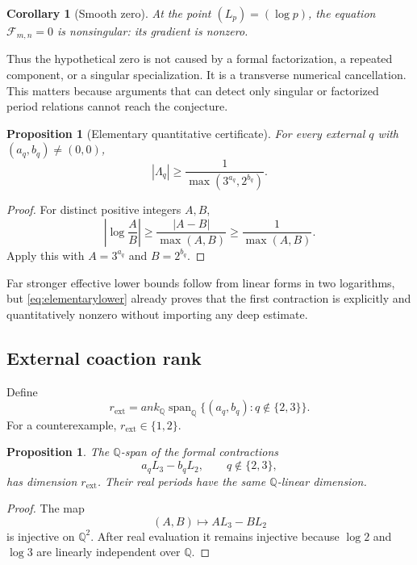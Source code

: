 \documentclass[11pt,oneside]{article}
\newtheorem{proposition}[theorem]{Proposition}
\newtheorem{corollary}[theorem]{Corollary}
\theoremstyle{definition}
\newcommand{\Q}{\mathbb Q}
\newcommand{\Span}{\operatorname{span}}
\begin{document}
\begin{corollary}[Smooth zero]
At the point $(L_p)=(\log p)$, the equation $\mathcal F_{m,n}=0$ is nonsingular: its gradient is nonzero.
\end{corollary}

Thus the hypothetical zero is not caused by a formal factorization, a repeated component, or a singular specialization.  It is a transverse numerical cancellation.  This matters because arguments that can detect only singular or factorized period relations cannot reach the conjecture.

\begin{proposition}[Elementary quantitative certificate]
For every external $q$ with $(a_q,b_q)\ne(0,0)$,
\begin{equation}\label{eq:elementarylower}
  |\Lambda_q|
  \ge
  \frac{1}{\max(3^{a_q},2^{b_q})}.
\end{equation}
\end{proposition}

\begin{proof}
For distinct positive integers $A,B$,
\[
  \left|\log\frac AB\right|
  \ge \frac{|A-B|}{\max(A,B)}
  \ge \frac1{\max(A,B)}.
\]
Apply this with $A=3^{a_q}$ and $B=2^{b_q}$.
\end{proof}

Far stronger effective lower bounds follow from linear forms in two logarithms, but \eqref{eq:elementarylower} already proves that the first contraction is explicitly and quantitatively nonzero without importing any deep estimate.

\subsection{External coaction rank}

Define
\[
 r_{\mathrm{ext}}=
ank_{\Q}
 \Span_{\Q}\{(a_q,b_q):q\notin\{2,3\}\}.
\]
For a counterexample, $r_{\mathrm{ext}}\in\{1,2\}$.

\begin{proposition}
The $\Q$-span of the formal contractions
\[
  a_qL_3-b_qL_2,
  \qquad q\notin\{2,3\},
\]
has dimension $r_{\mathrm{ext}}$.  Their real periods have the same $\Q$-linear dimension.
\end{proposition}

\begin{proof}
The map
\[
  (A,B)\longmapsto AL_3-BL_2
\]
is injective on $\Q^2$.  After real evaluation it remains injective because $\log2$ and $\log3$ are linearly independent over $\Q$.
\end{proof}
\end{document}

